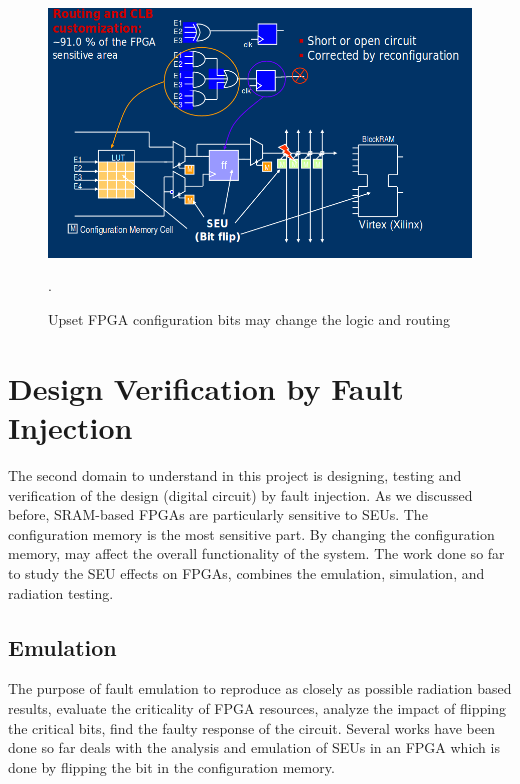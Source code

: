 \begin{figure}
 \centering
  \captionsetup{justification=centering}    
   \includegraphics[scale=0.4]{figures/img/seu.png}
   \caption{Upset FPGA configuration bits may change the logic and routing~\citep{manuzzato2010single}}.
\label{fig:seu}
\end{figure}






\section{Design Verification by Fault Injection}




The second domain to understand in this project is designing, testing and verification of the design (digital circuit) by fault injection. As we discussed before, SRAM-based FPGAs are particularly sensitive to SEUs. The configuration memory is the most sensitive part. By changing the configuration memory, may affect the overall functionality of the system. The work done so far to study the SEU effects on FPGAs, combines the emulation, simulation, and radiation testing.

\subsection{Emulation}

The purpose of fault emulation to reproduce as closely as possible radiation based results, evaluate the criticality of FPGA resources, analyze the impact of flipping the critical bits, find the faulty response of the circuit. Several works have been done so far deals with the analysis and emulation of SEUs in an FPGA which is done by flipping the bit in the configuration memory. 

